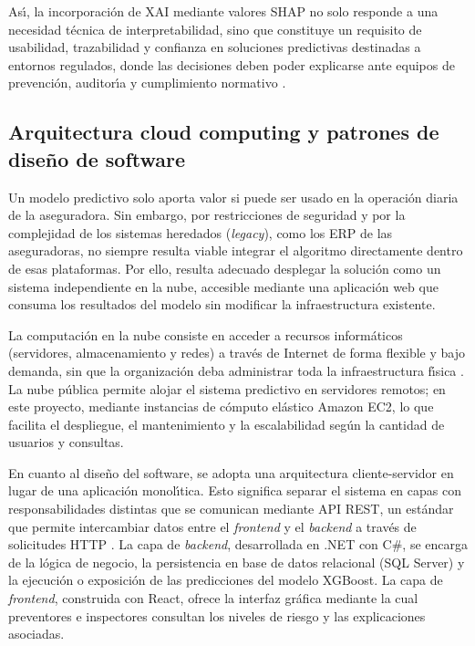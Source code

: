 As\'{\i}, la incorporaci\'on de XAI mediante valores SHAP no solo responde a una necesidad t\'ecnica de interpretabilidad, sino que constituye un requisito de usabilidad, trazabilidad y confianza en soluciones predictivas destinadas a entornos regulados, donde las decisiones deben poder explicarse ante equipos de prevenci\'on, auditor\'{\i}a y cumplimiento normativo \parencite{arrieta2020,lundberg2017}.

\subsection{Arquitectura cloud computing y patrones de dise\~no de software}

Un modelo predictivo solo aporta valor si puede ser usado en la operaci\'on diaria de la aseguradora. Sin embargo, por restricciones de seguridad y por la complejidad de los sistemas heredados (\emph{legacy}), como los ERP de las aseguradoras, no siempre resulta viable integrar el algoritmo directamente dentro de esas plataformas. Por ello, resulta adecuado desplegar la soluci\'on como un sistema independiente en la nube, accesible mediante una aplicaci\'on web que consuma los resultados del modelo sin modificar la infraestructura existente.

La computaci\'on en la nube consiste en acceder a recursos inform\'aticos (servidores, almacenamiento y redes) a trav\'es de Internet de forma flexible y bajo demanda, sin que la organizaci\'on deba administrar toda la infraestructura f\'{\i}sica \parencite{mell2011}. La nube p\'ublica permite alojar el sistema predictivo en servidores remotos; en este proyecto, mediante instancias de c\'omputo el\'astico Amazon EC2, lo que facilita el despliegue, el mantenimiento y la escalabilidad seg\'un la cantidad de usuarios y consultas.

En cuanto al dise\~no del software, se adopta una arquitectura cliente-servidor en lugar de una aplicaci\'on monol\'{\i}tica. Esto significa separar el sistema en capas con responsabilidades distintas que se comunican mediante API REST, un est\'andar que permite intercambiar datos entre el \emph{frontend} y el \emph{backend} a trav\'es de solicitudes HTTP \parencite{fielding2000}. La capa de \emph{backend}, desarrollada en .NET con C\#, se encarga de la l\'ogica de negocio, la persistencia en base de datos relacional (SQL Server) y la ejecuci\'on o exposici\'on de las predicciones del modelo XGBoost. La capa de \emph{frontend}, construida con React, ofrece la interfaz gr\'afica mediante la cual preventores e inspectores consultan los niveles de riesgo y las explicaciones asociadas.

